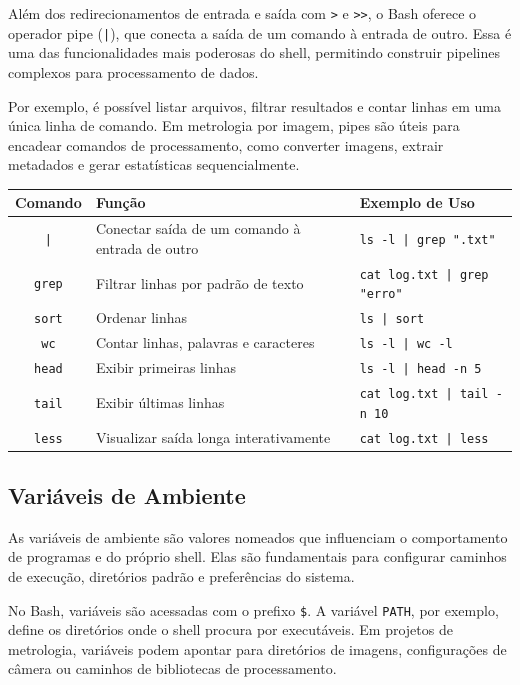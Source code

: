 \documentclass[12pt]{article}
\begin{document}
Além dos redirecionamentos de entrada e saída com \texttt{>} e \texttt{>>}, o Bash oferece o operador pipe (\texttt{|}), que conecta a saída de um comando à entrada de outro. Essa é uma das funcionalidades mais poderosas do shell, permitindo construir pipelines complexos para processamento de dados.

Por exemplo, é possível listar arquivos, filtrar resultados e contar linhas em uma única linha de comando. Em metrologia por imagem, pipes são úteis para encadear comandos de processamento, como converter imagens, extrair metadados e gerar estatísticas sequencialmente.

\begin{cmdbox}
\begin{tabularx}{\linewidth}{@{}C >{\raggedright\arraybackslash}X >{\raggedright\arraybackslash}X@{}}
\toprule
\textbf{Comando} & \textbf{Função} & \textbf{Exemplo de Uso} \\
\midrule
\texttt{|} & Conectar saída de um comando à entrada de outro & \texttt{ls -l | grep ".txt"} \\
\texttt{grep} & Filtrar linhas por padrão de texto & \texttt{cat log.txt | grep "erro"} \\
\texttt{sort} & Ordenar linhas & \texttt{ls | sort} \\
\texttt{wc} & Contar linhas, palavras e caracteres & \texttt{ls -l | wc -l} \\
\texttt{head} & Exibir primeiras linhas & \texttt{ls -l | head -n 5} \\
\texttt{tail} & Exibir últimas linhas & \texttt{cat log.txt | tail -n 10} \\
\texttt{less} & Visualizar saída longa interativamente & \texttt{cat log.txt | less} \\
\bottomrule
\end{tabularx}
\end{cmdbox}

\subsection{Variáveis de Ambiente}

As variáveis de ambiente são valores nomeados que influenciam o comportamento de programas e do próprio shell. Elas são fundamentais para configurar caminhos de execução, diretórios padrão e preferências do sistema.

No Bash, variáveis são acessadas com o prefixo \texttt{\$}. A variável \texttt{PATH}, por exemplo, define os diretórios onde o shell procura por executáveis. Em projetos de metrologia, variáveis podem apontar para diretórios de imagens, configurações de câmera ou caminhos de bibliotecas de processamento.
\end{document}
